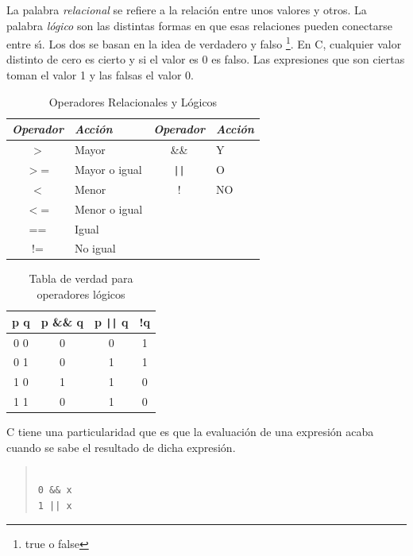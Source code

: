 
La palabra \emph{relacional} se refiere a la relaci\'on entre unos valores y
otros. La palabra \emph{l\'ogico} son las distintas formas en que esas 
relaciones pueden conectarse entre s\'{\i}. Los dos se basan en la idea de
verdadero y falso \footnote{true o false}. En C, cualquier valor distinto de
cero es cierto y si el valor es 0 es falso. Las expresiones que son ciertas
toman el valor 1 y las falsas el valor 0.

\begin{table}[!hbp]
\begin{tabular}{|c|l|c|l|}\hline
\em Operador & \em Acci\'on & \em Operador & \em Acci\'on\\\hline
\hline
$>$ & Mayor & \&\& & Y\\\hline
$>$= & Mayor o igual & \texttt{||} & O\\\hline
$<$ & Menor & ! & NO\\\hline
$<$= & Menor o igual\\\hline
== & Igual\\\hline
!= & No igual\\\hline

\end{tabular}
\caption{Operadores Relacionales y L\'ogicos}
\end{table}

\begin{table}[!hbp]
\begin{tabular}{|c|c|c|c|}\hline
p q & p \&\& q & p \texttt{||} q & !q\\\hline
0 0 & 0 & 0 & 1\\\hline
0 1 & 0 & 1 & 1\\\hline
1 0 & 1 & 1 & 0\\\hline
1 1 & 0 & 1 & 0\\\hline

\end{tabular}
\caption{Tabla de verdad para operadores l\'ogicos}
\end{table}

C tiene una particularidad que es que la evaluaci\'on de una expresi\'on acaba
cuando se sabe el resultado de dicha expresi\'on.

\begin{quotation}
\begin{verbatim}

0 && x
1 || x

\end{verbatim}
\end{quotation}

